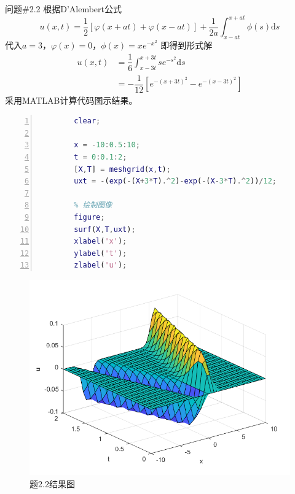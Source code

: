 \documentclass[12pt]{ctexart}
\begin{document}
    \begin{problem}{问题\#2.2}
        根据D'Alembert公式
        $$
        u(x,t)=\dfrac{1}{2}[\varphi(x+at)+\varphi(x-at)]+\dfrac{1}{2a}\int^{x+at}_{x-at}\phi(s)\text{d}s
        $$
        代入$a=3$，$\varphi(x)=0$，$\phi(x)=xe^{-x^2}$
        即得到形式解
        $$
        \begin{aligned}
            u(x,t)&=\dfrac{1}{6}\int^{x+3t}_{x-3t}se^{-s^2}\text{d}s\\
            &=-\dfrac{1}{12}[e^{-(x+3t)^2}-e^{-(x-3t)^2}]
        \end{aligned}
        $$
        采用MATLAB计算代码图示结果。
    \end{problem}
    \begin{lstlisting}[language = Matlab,title={test7\_2\_2.m},  numbers=left, 
        numberstyle=\tiny,keywordstyle=\color{blue!70},
        commentstyle=\color{red!50!green!50!blue!50},frame=shadowbox,
        rulesepcolor=\color{red!20!green!20!blue!20},basicstyle=\ttfamily]
        % 问题2.2达朗贝尔解图示
        clear;

        x = -10:0.5:10;
        t = 0:0.1:2;
        [X,T] = meshgrid(x,t);
        uxt = -(exp(-(X+3*T).^2)-exp(-(X-3*T).^2))/12;

        % 绘制图像
        figure;
        surf(X,T,uxt);
        xlabel('x');
        ylabel('t');
        zlabel('u');
    \end{lstlisting}
    \begin{figure}[htbp]
        \small
        \centering
        \includegraphics[width=14cm]{fig2.png}
        \caption{题2.2结果图} \label{Fig:aa}
    \end{figure}
\end{document}
